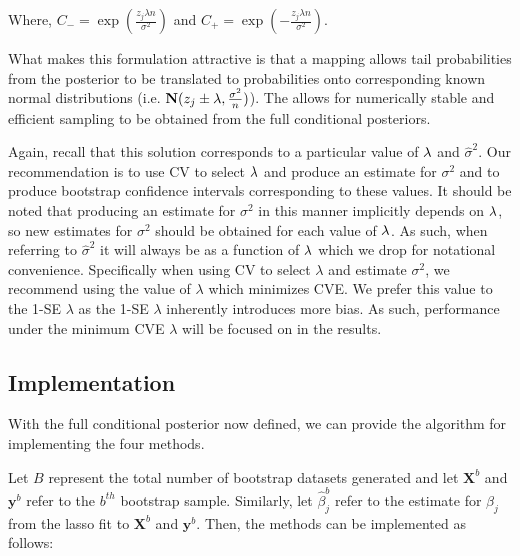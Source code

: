 Where, $C_{-} = \exp(\frac{z_j \lambda n}{\sigma^2})$ and $C_{+} = \exp(-\frac{z_j \lambda n}{\sigma^2})$.

What makes this formulation attractive is that a mapping allows tail probabilities from the posterior to be translated to probabilities onto corresponding known normal distributions (i.e. $\mathbf{N}(z_j \pm \lambda, \frac{\sigma^2}{n})$). The allows for numerically stable and efficient sampling to be obtained from the full conditional posteriors.

Again, recall that this solution corresponds to a particular value of $\lambda$ and $\hat{\sigma}^2$. Our recommendation is to use CV to select $\lambda$ and produce an estimate for $\sigma^2$ and to produce bootstrap confidence intervals corresponding to these values. It should be noted that producing an estimate for $\sigma^2$ in this manner implicitly depends on $\lambda$, so new estimates for $\sigma^2$ should be obtained for each value of $\lambda$. As such, when referring to $\hat{\sigma}^2$ it will always be as a function of $\lambda$ which we drop for notational convenience.  Specifically when using CV to select $\lambda$ and estimate $\sigma^2$, we recommend using the value of $\lambda$ which minimizes CVE. We prefer this value to the 1-SE $\lambda$ as the 1-SE $\lambda$ inherently introduces more bias. As such, performance under the minimum CVE $\lambda$ will be focused on in the results.

\subsection{Implementation}
\label{Sec:implementation}


With the full conditional posterior now defined, we can provide the algorithm for implementing the four methods.

Let $B$ represent the total number of bootstrap datasets generated and let $\boldsymbol{X}^b$ and $\boldsymbol{y}^b$ refer to the $b^{th}$ bootstrap sample. Similarly, let $\hat{\beta}^b_j$ refer to the estimate for $\beta_j$ from the lasso fit to $\boldsymbol{X}^b$ and $\boldsymbol{y}^b$. Then, the methods can be implemented as follows:

